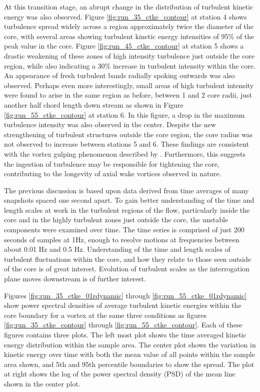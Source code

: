 


At this transition stage, an abrupt change in the distribution of turbulent 
kinetic energy was also observed. Figure 
\ref{fig:run_35_ctke_contour} at station 4 shows turbulence spread widely 
across a region approximately twice the diameter of the core, with several 
areas showing turbulent kinetic energy intensities of 95\% of the peak value in 
the core. Figure \ref{fig:run_45_ctke_contour} at station 5 shows a drastic 
weakening of these zones of high intensity turbulence just outside the core 
region, while also indicating a 30\% increase in turbulent intensity within the 
core. An appearance of fresh turbulent bands radially spoking outwards was also 
observed. Perhaps even more interestingly, small areas of high turbulent 
intensity were found to arise in the same region as before, between 1 and 2 
core radii, just another half chord length down stream as shown in Figure 
\ref{fig:run_55_ctke_contour} at station 6. In this figure, a drop 
in the maximum turbulence intensity was also observed in the center. Despite 
the new strengthening of turbulent structures outside the core region, the core 
radius was not observed to increase between stations 5 and 6. These findings 
are consistent with the vortex gulping phenomenon described by 
\cite{bandyopadhyay1991}. Furthermore, this suggests the ingestion of 
turbulence may be responsible for tightening the core, contributing to the 
longevity of axial wake vortices observed in nature.





The previous discussion is based upon data derived from time averages of many 
snapshots spaced one second apart. To gain better understanding of the time and 
length scales at work in the turbulent regions of the flow, particularly inside 
the core and in the highly turbulent zones just outside the core, the unstable 
components were examined over time. The time series is comprised of just 200 
seconds of samples at 1Hz, enough to resolve motions at frequencies between 
about 0.01 Hz and 0.5 Hz. Understanding of the time and length scales of 
turbulent fluctuations within the core, and how they relate to those seen 
outside of the core is of great interest. Evolution of turbulent scales as the 
interrogation plane moves downstream is of further interest. 

Figures \ref{fig:run_35_ctke_01rdynamic} through 
\ref{fig:run_55_ctke_01rdynamic} show power spectral densities of 
average turbulent kinetic energies within the core boundary for a vortex at the 
same three conditions as figures \ref{fig:run_35_ctke_contour} through 
\ref{fig:run_55_ctke_contour}. Each of these figures contains three plots. The 
left most plot shows the time averaged kinetic energy distribution within the 
sample area. The center plot shows the variation in kinetic energy over time 
with both the mean value of all points within the sample area shown, 
and 5th and 95th percentile boundaries to show the spread. The plot at right 
shows the log of the power spectral density (PSD) of the mean line shown in the 
center plot. 

